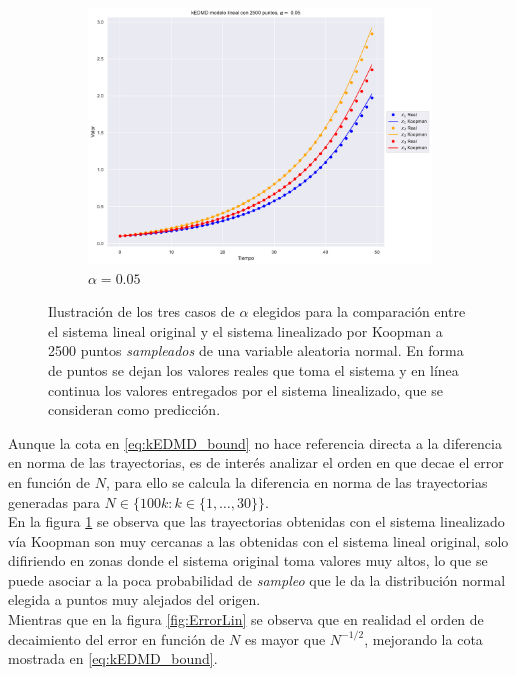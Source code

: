 \begin{figure}[htbp]
\begin{subfigure}[b]{0.32\textwidth}
        \centering
        \includegraphics[width=\textwidth]{img/content/chapter3/Linear3.pdf}
        \caption{$\alpha=0.05$}
    \end{subfigure}
    \caption{Ilustración de los tres casos de $\alpha$ elegidos para la comparación entre el sistema lineal original y el sistema linealizado por Koopman a 2500 puntos \textit{sampleados} de una variable aleatoria normal. En forma de puntos se dejan los valores reales que toma el sistema y en línea continua los valores entregados por el sistema linealizado, que se consideran como predicción.}
    \label{fig:Comp_traj_lin}
\end{figure}
Aunque la cota en \eqref{eq:kEDMD_bound} no hace referencia directa a la diferencia en norma de las trayectorias, es de interés analizar el orden en que decae el error en función de $N$, para ello se calcula la diferencia en norma de las trayectorias generadas para $N \in \{ 100k : k \in \{1, \dots, 30\} \}$. \\
En la figura \ref{fig:Comp_traj_lin} se observa que las trayectorias obtenidas con el sistema linealizado vía Koopman son muy cercanas a las obtenidas con el sistema lineal original, solo difiriendo en zonas donde el sistema original toma valores muy altos, lo que se puede asociar a la poca probabilidad de \textit{sampleo} que le da la distribución normal elegida a puntos muy alejados del origen. \\
Mientras que en la figura \ref{fig:ErrorLin} se observa que en realidad el orden de decaimiento del error en función de $N$ es mayor que $N^{-1/2}$, mejorando la cota mostrada en \eqref{eq:kEDMD_bound}.

